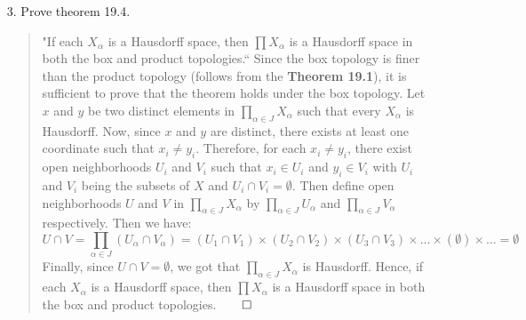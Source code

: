 \documentclass[12pt, a4paper]{article}
\newcommand\und[1]{\underline{\smash{#1}}}
\begin{document}
\begin{itemize}
\item[3.]
Prove theorem 19.4.
\begin{quote}
\und{\textbf{Theorem 19.4}}
\vspace{0.2cm}
\newline
"If each $X_\alpha$ is a Hausdorff space, then $\displaystyle\prod X_\alpha$ is a Hausdorff space in both the box and product topologies.``
\newline
\newline
Since the box topology is finer than the product topology (follows from the \textbf{Theorem 19.1}), it is sufficient
to prove that the theorem holds under the box topology. Let $x$ and $y$
be two distinct elements in $\displaystyle\prod_{\alpha \in J}X_\alpha$
\vspace{0.15cm}
such that every $X_\alpha$ is Hausdorff. Now, since $x$ and $y$ are distinct,
there exists at least one coordinate such that $x_i \neq y_i$. Therefore, for
each $x_i \neq y_i$, there exist open neighborhoods $U_i$ and $V_i$ such that
$x_i \in U_i$ and $y_i \in V_i$ with $U_i$ and $V_i$ being the subsets of $X$
and $U_i \cap V_i = \emptyset$. Then define open neighborhoods $U$ and $V$ in $\displaystyle\prod_{\alpha \in J} X_\alpha$
by $\displaystyle\prod_{\alpha \in J} U_\alpha$ and $\displaystyle\prod_{\alpha \in J} V_\alpha$
respectively. Then we have:
$$U \cap V = \displaystyle\prod_{\alpha \in J}(U_\alpha \cap V_\alpha ) = (U_1 \cap V_1) \times (U_2 \cap V_2) \times (U_3 \cap V_3) \times ... \times (\emptyset) \times ... = \emptyset$$
Finally, since $U \cap V = \emptyset$, we got that $\displaystyle\prod_{\alpha \in J}X_\alpha$
is Hausdorff. Hence, if each $X_\alpha$ is a Hausdorff space, then $\prod X_\alpha$ is a Hausdorff space
in both the box and product topologies.$\qed$
\end{quote}

\item[]
\item[]


\end{itemize}
\end{document}
